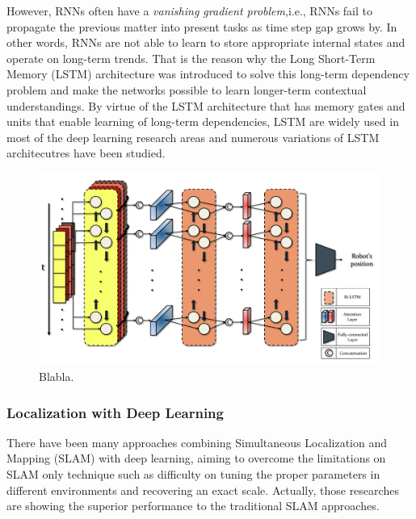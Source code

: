 \documentclass[letterpaper, 10 pt, conference]{ieeeconf}  %
\begin{document}
However, RNNs often have a \textit{vanishing gradient problem},i.e., RNNs fail to propagate the previous matter into present tasks as time step gap grows by. In other words, RNNs are not able to learn to store appropriate internal states and operate on long-term trends. That is the reason why the Long Short-Term Memory (LSTM) architecture was introduced to solve this long-term dependency problem and make the networks possible to learn longer-term contextual understandings\cite{hochreiter1997long}.
By virtue of the LSTM architecture that has memory gates and units that enable learning of long-term dependencies\cite{zaremba2014learning}, LSTM are widely used in most of the deep learning research areas and numerous variations of LSTM architecutres have been studied.

\begin{figure}[ht]
	
	\centering
	\includegraphics[height=10 cm]{CE554_networks}
	
	\label{fig:example}
	
	\caption{Blabla. }
	
\end{figure}


\subsubsection{Localization with Deep Learning}
There have been many approaches combining Simultaneous Localization and Mapping (SLAM) with deep learning, aiming to overcome the limitations on SLAM only technique such as difficulty on tuning the proper parameters in different environments and recovering an exact scale. Actually, those researches are showing the superior performance to the traditional SLAM approaches.
\end{document}
